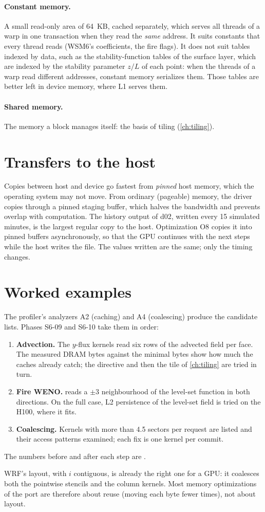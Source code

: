 \paragraph{Constant memory.} A small read-only area of 64~KB, cached separately, which serves all threads of a warp in
one transaction when they read the \emph{same} address. It suits constants that every thread reads (WSM6's
coefficients, the fire flags). It does not suit tables indexed by data, such as the stability-function tables of the
surface layer, which are indexed by the stability parameter $z/L$ of each point: when the threads of a warp read
different addresses, constant memory serializes them. Those tables are better left in device memory, where L1
serves them.

\paragraph{Shared memory.} The memory a block manages itself: the basis of tiling (\cref{ch:tiling}).

\section{Transfers to the host}

Copies between host and device go fastest from \emph{pinned} host memory, which the operating system may not move.
From ordinary (pageable) memory, the driver copies through a pinned staging buffer, which halves the bandwidth and
prevents overlap with computation. The history output of d02, written every 15 simulated minutes, is the largest
regular copy to the host. Optimization O8 copies it into pinned buffers asynchronously, so that the GPU continues with
the next steps while the host writes the file. The values written are the same; only the timing changes.

\section{Worked examples}

The profiler's analyzers A2 (caching) and A4 (coalescing) produce the candidate lists. Phases S6-09 and S6-10 take them
in order:
\begin{enumerate}
  \item \textbf{Advection.} The $y$-flux kernels read six rows of the advected field per face. The measured DRAM bytes
    against the minimal bytes show how much the caches already catch; the  directive and then the tile of
    \cref{ch:tiling} are tried in turn.
  \item \textbf{Fire WENO.}  reads a $\pm 3$ neighbourhood of the level-set function in both directions.
    On the full case, L2 persistence of the level-set field is tried on the H100, where it fits.
  \item \textbf{Coalescing.} Kernels with more than 4.5 sectors per request are listed and their access patterns
    examined; each fix is one kernel per commit.
\end{enumerate}
The numbers before and after each step are \tbr.

\begin{keypoint}
WRF's layout, with $i$ contiguous, is already the right one for a GPU: it coalesces both the pointwise stencils and
the column kernels. Most memory optimizations of the port are therefore about reuse (moving each byte fewer times),
not about layout.
\end{keypoint}
